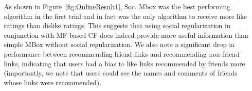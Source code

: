 As shown in Figure~\ref{fig:OnlineResult1}, Soc. Mbox was the
best performing algorithm in the first trial and in fact was the only
algorithm to receive more like ratings than dislike ratings. 
This suggests that using social regularization in conjunction with
MF-based CF does indeed provide more useful information than simple
MBox without social regularization.  We also note a
significant drop in performance between recommending friend links and
recommending non-friend links, indicating that users had a bias to
like links recommended by friends more (importantly, we note that
users could see the names and comments of friends whose links were recommended).
\begin{figure}[t!]
\centering
{}

\end{figure}
